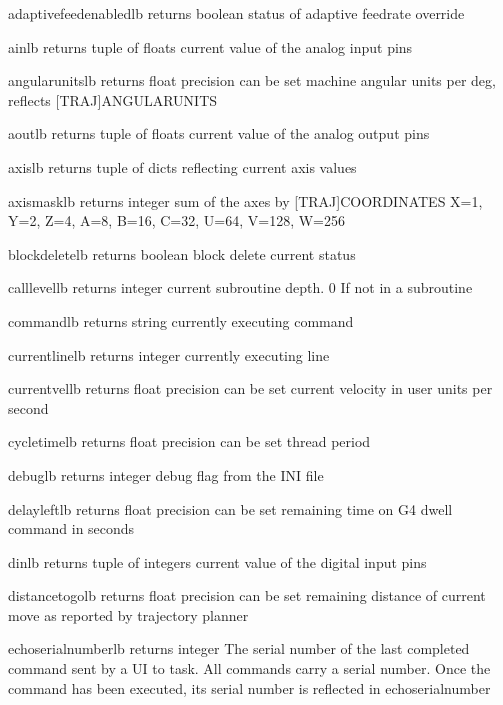 \documentclass[letterpaper,10pt,english]{sphinxmanual}
\begin{document}
\begin{sphinxVerbatim}[commandchars=\\\{\}]
adaptive\PYGZus{}feed\PYGZus{}enabled\PYGZus{}lb \PYGZhy{} returns boolean
status of adaptive feedrate override

ain\PYGZus{}lb \PYGZhy{} returns tuple of floats
current value of the analog input pins

angular\PYGZus{}units\PYGZus{}lb \PYGZhy{} returns float \PYGZhy{} precision can be set
machine angular units per deg, reflects [TRAJ]ANGULAR\PYGZus{}UNITS

aout\PYGZus{}lb \PYGZhy{} returns tuple of floats
current value of the analog output pins

axis\PYGZus{}lb \PYGZhy{} returns tuple of dicts
reflecting current axis values

axis\PYGZus{}mask\PYGZus{}lb \PYGZhy{} returns integer
sum of the axes by [TRAJ]COORDINATES X=1, Y=2, Z=4, A=8, B=16, C=32, U=64, V=128, W=256

block\PYGZus{}delete\PYGZus{}lb \PYGZhy{} returns boolean
block delete current status

call\PYGZus{}level\PYGZus{}lb \PYGZhy{} returns integer
current subroutine depth. \PYGZhy{} 0 If not in a subroutine

command\PYGZus{}lb \PYGZhy{} returns string
currently executing command

current\PYGZus{}line\PYGZus{}lb \PYGZhy{} returns integer
currently executing line

current\PYGZus{}vel\PYGZus{}lb \PYGZhy{} returns float \PYGZhy{} precision can be set
current velocity in user units per second

cycle\PYGZus{}time\PYGZus{}lb \PYGZhy{} returns float \PYGZhy{} precision can be set
thread period

debug\PYGZus{}lb \PYGZhy{} returns integer
debug flag from the INI file

delay\PYGZus{}left\PYGZus{}lb \PYGZhy{} returns float \PYGZhy{} precision can be set
remaining time on G4 dwell command in seconds

din\PYGZus{}lb \PYGZhy{} returns tuple of integers
current value of the digital input pins

distance\PYGZus{}to\PYGZus{}go\PYGZus{}lb \PYGZhy{} returns float \PYGZhy{} precision can be set
remaining distance of current move as reported by trajectory planner

echo\PYGZus{}serial\PYGZus{}number\PYGZus{}lb \PYGZhy{} returns integer
The serial number of the last completed command sent by a UI to task.
All commands carry a serial number. Once the command has been executed,
its serial number is reflected in echo\PYGZus{}serial\PYGZus{}number


\end{sphinxVerbatim}
\end{document}
